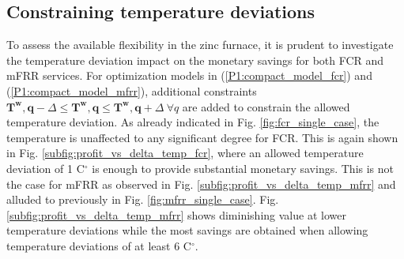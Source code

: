 \documentclass[conference]{IEEEtran}
\begin{document}
\subsection{Constraining temperature deviations}
\vspace{-1mm}
To assess the available flexibility in the zinc furnace, it is prudent to investigate the temperature deviation impact on the monetary savings for both FCR and mFRR services. For optimization models in (\ref{P1:compact_model_fcr}) and (\ref{P1:compact_model_mfrr}), additional constraints $\bm{T^{w},q} - \Delta \leq \bm{T^{w},q} \leq \bm{T^{w},q} + \Delta \ \forall{q}$ are added to constrain the allowed temperature deviation.
%
As already indicated  in Fig. \ref{fig:fcr_single_case}, the temperature is unaffected to any significant degree for FCR. This is again shown in Fig. \ref{subfig:profit_vs_delta_temp_fcr}, where an allowed temperature deviation of 1 C$^{\circ}$ is enough to provide substantial monetary savings. This is not the case for mFRR as observed in Fig. \ref{subfig:profit_vs_delta_temp_mfrr} and alluded to previously in Fig. \ref{fig:mfrr_single_case}. Fig. \ref{subfig:profit_vs_delta_temp_mfrr} shows diminishing value at lower temperature deviations while the most savings are obtained when allowing temperature deviations of at least 6 C$^{\circ}$.





\end{document}
